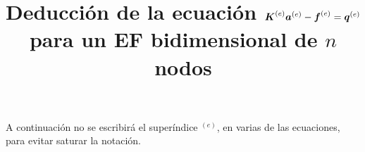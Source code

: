 \documentclass[12pt,letterpaper, landscape]{article}
\title{Deducción de la ecuación $\ma{K}^{(e)} \ve{a}^{(e)} - \ma{f}^{(e)} = \ma{q}^{(e)}$ para un EF bidimensional de $n$ nodos}
\date{}
\newcommand{\e}{{}}
\newcommand{\ve}[1]{{\boldsymbol{#1}}}
\newcommand{\ma}[1]{{\boldsymbol{#1}}}
\newcommand{\dd}{\operatorname{d} \!}
\begin{document}
\maketitle

A continuación no se escribirá el superíndice ${}^{(e)}$, en varias de las ecuaciones, para evitar saturar la notación.

%
%
%
%
%
\end{document}
